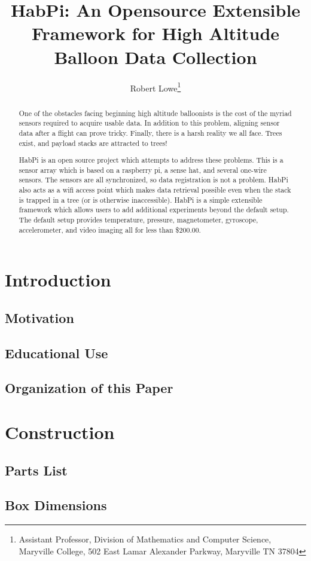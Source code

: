 \documentclass[journal]{new-aiaa}
\title{HabPi: An Opensource Extensible Framework for High Altitude
Balloon Data Collection}
\author{Robert Lowe\footnote{Assistant Professor, Division of
Mathematics and Computer Science, Maryville College, 502 East Lamar
Alexander Parkway, Maryville TN 37804}}
\affil{Maryville College}
\begin{document}
\maketitle

\begin{abstract}
One of the obstacles facing beginning high altitude balloonists
is the cost of the myriad sensors required to acquire usable data.
In addition to this problem, aligning sensor data after a flight can
prove tricky.  Finally, there is a harsh reality we all face.  Trees
exist, and payload stacks are attracted to trees!

HabPi is an open source project which attempts to address these
problems.  This is a sensor array which is based on a raspberry pi,
a sense hat, and several one-wire sensors.  The sensors are all
synchronized, so data registration is not a problem.  HabPi also acts
as a wifi access point which makes data retrieval possible even when
the stack is trapped in a tree (or is otherwise inaccessible).  HabPi
is a simple extensible framework which allows users to add additional
experiments beyond the default setup.  The default setup provides
temperature, pressure, magnetometer, gyroscope, accelerometer, and
video imaging all for less than \$200.00.
\end{abstract}

\section{Introduction}
\subsection{Motivation}
\subsection{Educational Use}
\subsection{Organization of this Paper}

\section{Construction}
\subsection{Parts List}
\subsection{Box Dimensions}
\end{document}
